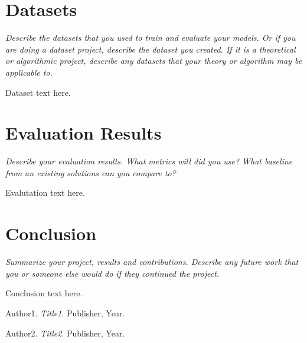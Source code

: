 \documentclass[11pt, oneside]{article}   	%
\begin{document}
\section*{Datasets}

\textit{Describe the datasets that you used to train and evaluate your
models. Or if you are doing a dataset project, describe the dataset you
created. If it is a theoretical
or algorithmic project, describe any datasets that your theory or algorithm
may be applicable to.}

Dataset text here.

\section*{Evaluation Results}

\textit{Describe your evaluation results. What metrics
will did you use? What baseline from an existing solutions can you compare to?}

Evalutation text here.


\section*{Conclusion}

\textit{Summarize your project, results and contributions. Describe any
future work that you or someone else would do if they continued the project.}

Conclusion text here.

\begin{thebibliography}{9}

Author1. 
\textit{Title1}.
Publisher, Year.

Author2. 
\textit{Title2}.
Publisher, Year.

\end{thebibliography}
\end{document}
